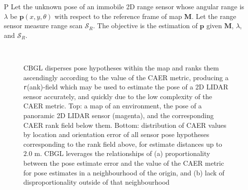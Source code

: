 \begin{customprb}{P}
  \label{prob:the_problem}
  Let the unknown pose of an immobile 2D range sensor whose angular range is
  $\lambda$ be $\bm{p}(x,y,\theta)$ with respect to the reference frame of map
  $\bm{M}$. Let the range sensor measure range scan $\mathcal{S}_R$. The
  objective is the estimation of $\bm{p}$ given $\bm{M}$, $\lambda$, and
  $\mathcal{S}_R$.
\end{customprb}

\begin{figure}\vspace{0.4em}
  \subfloat{    \label{fig:a}} \vspace{-1.7cm}\\
  \subfloat{\hspace{-0.3cm} \label{fig:b}}
  \caption{\small
           CBGL disperses pose hypotheses within the map and ranks them
           ascendingly according to the value of the CAER metric, producing a
           \texttt{r}(ank)-field which may be used to estimate the pose of a
           2D LIDAR sensor accurately, and quickly due to the low complexity of
           the CAER metric.
           Top: a map of an environment, the pose of a panoramic 2D LIDAR sensor
           (magenta), and the corresponding CAER rank field below them.
           Bottom: distribution of CAER values by location and orientation
           error of all sensor pose hypotheses corresponding to the rank field
           above, for estimate distances up to $2.0$ m.
           CBGL leverages the relationships of (a) proportionality between the
           pose estimate error and the value of the CAER metric for pose
           estimates in a neighbourhood of the origin, and (b) lack of
           disproportionality outside of that neighbourhood
           }
  \vspace{-0.75cm}
  \label{fig:AB}
\end{figure}
